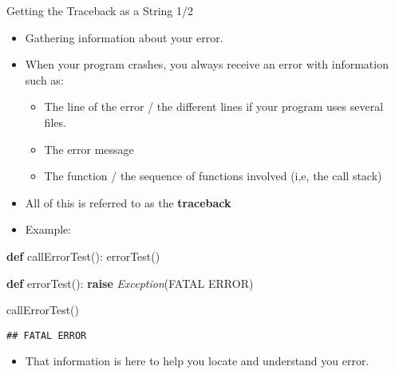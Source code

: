 \documentclass[
  8pt,
  ignorenonframetext,
]{beamer}
\newenvironment{Shaded}{\begin{snugshade}}{\end{snugshade}}
\newcommand{\ControlFlowTok}[1]{\textcolor[rgb]{0.13,0.29,0.53}{\textbf{#1}}}
\newcommand{\KeywordTok}[1]{\textcolor[rgb]{0.13,0.29,0.53}{\textbf{#1}}}
\newcommand{\NormalTok}[1]{#1}
\newcommand{\PreprocessorTok}[1]{\textcolor[rgb]{0.56,0.35,0.01}{\textit{#1}}}
\newcommand{\StringTok}[1]{\textcolor[rgb]{0.31,0.60,0.02}{#1}}
\providecommand{\tightlist}{%
  \setlength{\itemsep}{0pt}\setlength{\parskip}{0pt}}
\begin{document}
\begin{frame}[fragile]{Getting the Traceback as a String 1/2}
\protect\hypertarget{getting-the-traceback-as-a-string-12}{}
\begin{itemize}
\item
  Gathering information about your error.
\item
  When your program crashes, you always receive an error with
  information such as:

  \begin{itemize}
  \tightlist
  \item
    The line of the error / the different lines if your program uses
    several files.
  \item
    The error message
  \item
    The function / the sequence of functions involved (i,e, the call
    stack)
  \end{itemize}
\item
  All of this is referred to as the \textbf{traceback}
\item
  Example:
\end{itemize}

\begin{Shaded}
\begin{Highlighting}[]
\KeywordTok{def}\NormalTok{ callErrorTest():}
\NormalTok{  errorTest()}

\KeywordTok{def}\NormalTok{ errorTest():}
  \ControlFlowTok{raise} \PreprocessorTok{Exception}\NormalTok{(}\StringTok{\textquotesingle{}FATAL ERROR\textquotesingle{}}\NormalTok{)}

\NormalTok{callErrorTest()}
\end{Highlighting}
\end{Shaded}

\begin{verbatim}
## FATAL ERROR
\end{verbatim}

\begin{itemize}
\tightlist
\item
  That information is here to help you locate and understand you error.
\end{itemize}
\end{frame}
\end{document}

